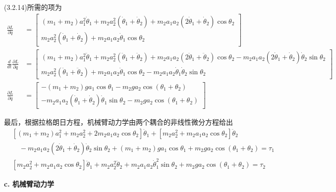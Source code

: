 \documentclass[12pt,a4paper]{ctexart}
\begin{document}
(3.2.14)所需的项为
\begin{align}
\frac{\partial L}{\partial \dot{q}} &= \begin{bmatrix} (m_1+m_2)a_1^2\dot{\theta}_1 + m_2a_2^2(\dot{\theta}_1+\dot{\theta}_2) + m_2a_1a_2(2\dot{\theta}_1+\dot{\theta}_2)\cos\theta_2 \\ m_2a_2^2(\dot{\theta}_1+\dot{\theta}_2) + m_2a_1a_2\dot{\theta}_1\cos\theta_2 \end{bmatrix} \\
\frac{d}{dt}\frac{\partial L}{\partial \dot{q}} &= \begin{bmatrix} (m_1+m_2)a_1^2\ddot{\theta}_1 + m_2a_2^2(\ddot{\theta}_1+\ddot{\theta}_2) + m_2a_1a_2(2\ddot{\theta}_1+\ddot{\theta}_2)\cos\theta_2 - m_2a_1a_2(2\dot{\theta}_1+\dot{\theta}_2)\dot{\theta}_2\sin\theta_2 \\ m_2a_2^2(\ddot{\theta}_1+\ddot{\theta}_2) + m_2a_1a_2\ddot{\theta}_1\cos\theta_2 - m_2a_1a_2\dot{\theta}_1\dot{\theta}_2\sin\theta_2 \end{bmatrix} \\
\frac{\partial L}{\partial q} &= \begin{bmatrix} -(m_1+m_2)ga_1\cos\theta_1 - m_2ga_2\cos(\theta_1+\theta_2) \\ -m_2a_1a_2(\dot{\theta}_1+\dot{\theta}_2)\dot{\theta}_1\sin\theta_2 - m_2ga_2\cos(\theta_1+\theta_2) \end{bmatrix}
\end{align}

最后，根据拉格朗日方程，机械臂动力学由两个耦合的非线性微分方程给出
\begin{align}
&[(m_1+m_2)a_1^2 + m_2a_2^2 + 2m_2a_1a_2\cos\theta_2]\ddot{\theta}_1 + [m_2a_2^2 + m_2a_1a_2\cos\theta_2]\ddot{\theta}_2 \\
&\quad - m_2a_1a_2(2\dot{\theta}_1+\dot{\theta}_2)\dot{\theta}_2\sin\theta_2 + (m_1+m_2)ga_1\cos\theta_1 + m_2ga_2\cos(\theta_1+\theta_2) = \tau_1 \nonumber \\
&[m_2a_2^2 + m_2a_1a_2\cos\theta_2]\ddot{\theta}_1 + m_2a_2^2\ddot{\theta}_2 + m_2a_1a_2\dot{\theta}_1^2\sin\theta_2 + m_2ga_2\cos(\theta_1+\theta_2) = \tau_2 \nonumber
\end{align}

\textbf{c. 机械臂动力学}
\end{document}
